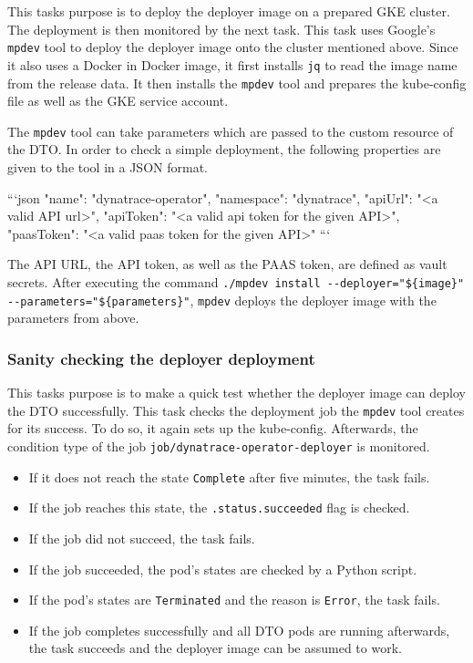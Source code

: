 This tasks purpose is to deploy the deployer image on a prepared GKE cluster.
The deployment is then monitored by the next task.
This task uses Google's \verb|mpdev| tool to deploy the deployer image onto the cluster mentioned above.
Since it also uses a Docker in Docker image, it first installs \verb|jq| to read the image name from the release data.
It then installs the \verb|mpdev| tool and prepares the kube-config file as well as the GKE service account.

The \verb|mpdev| tool can take parameters which are passed to the custom resource of the DTO.
In order to check a simple deployment, the following properties are given to the tool in a JSON format.

```json
    {
    "name": "dynatrace-operator",
    "namespace": "dynatrace",
    "apiUrl": "<a valid API url>",
    "apiToken": "<a valid api token for the given API>",
    "paasToken": "<a valid paas token for the given API>"
}
```

The API URL, the API token, as well as the PAAS token, are defined as vault secrets.
After executing the command \verb|./mpdev install --deployer="${image}" --parameters="${parameters}"|, \verb|mpdev| deploys the deployer image with the parameters from above.

\subsubsection{Sanity checking the deployer deployment}\label{subsubsec:sanity-check-deployer}

This tasks purpose is to make a quick test whether the deployer image can deploy the DTO successfully.
This task checks the deployment job the \verb|mpdev| tool creates for its success.
To do so, it again sets up the kube-config.
Afterwards, the condition type of the job \verb|job/dynatrace-operator-deployer| is monitored.

\begin{itemize}
    \item If it does not reach the state \verb|Complete| after five minutes, the task fails.
    \item If the job reaches this state, the \verb|.status.succeeded| flag is checked.
    \item If the job did not succeed, the task fails.
    \item If the job succeeded, the pod's states are checked by a Python script.
    \item If the pod's states are \verb|Terminated| and the reason is \verb|Error|, the task fails.
    \item If the job completes successfully and all DTO pods are running afterwards, the task succeeds and the deployer image can be assumed to work.
\end{itemize}
